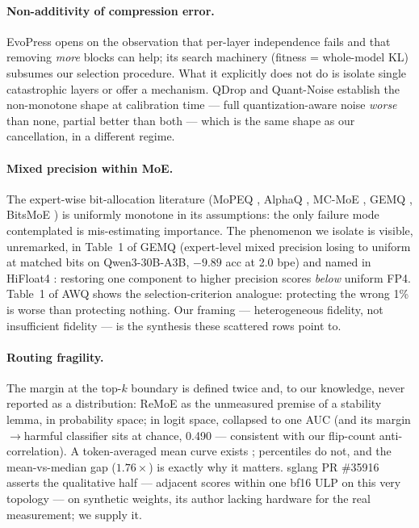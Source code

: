 \documentclass[10pt]{article} %
\begin{document}
\paragraph{Non-additivity of compression error.} EvoPress \citep{sieberling2025evopress} opens on the observation that per-layer independence fails and
that removing \emph{more} blocks can help; its search machinery (fitness = whole-model
KL) subsumes our selection procedure. What it explicitly does not do is
isolate single catastrophic layers or offer a mechanism. QDrop \citep{wei2022qdrop}
and Quant-Noise \citep{fan2021quantnoise} establish the non-monotone shape at calibration
time --- full quantization-aware noise \emph{worse} than none, partial better than
both --- which is the same shape as our cancellation, in a different regime.

\paragraph{Mixed precision within MoE.} The expert-wise bit-allocation literature
(MoPEQ \citep{chittyvenkata2025mopeq}, AlphaQ \citep{alphaq}, MC-MoE \citep{mcmoe}, GEMQ \citep{gemq}, BitsMoE \citep{bitsmoe}) is uniformly monotone in its
assumptions: the only failure mode contemplated is mis-estimating importance.
The phenomenon we isolate is visible, unremarked, in Table~1 of GEMQ \citep{gemq}
(expert-level mixed precision losing to uniform at matched bits on
Qwen3-30B-A3B, $-9.89$ acc at 2.0 bpe) and named in HiFloat4 \citep{mak2026hifloat4}:
restoring one component to higher precision scores \emph{below} uniform FP4.
Table~1 of AWQ \citep{lin2024awq} shows the selection-criterion analogue: protecting the wrong 1\%
is worse than protecting nothing. Our framing --- heterogeneous fidelity, not
insufficient fidelity --- is the synthesis these scattered rows point to.

\paragraph{Routing fragility.} The margin at the top-$k$ boundary is defined twice and,
to our knowledge, never reported as a distribution: ReMoE
\citep[App.~C.2]{zhu2026remoe} as the unmeasured premise
of a stability lemma, in probability space; \citet{gu2026routeflip} in logit space,
collapsed to one AUC (and its margin$\to$harmful classifier sits at chance,
0.490 --- consistent with our flip-count anti-correlation). A token-averaged
mean curve exists \citep{chen2026certainhead}; percentiles do not, and the
mean-vs-median gap ($1.76\times$) is exactly why it matters. sglang PR \#35916
\citep{sglang35916} asserts the qualitative half --- adjacent scores within one bf16 ULP on this
very topology --- on synthetic weights, its author lacking hardware for the
real measurement; we supply it.
\end{document}
